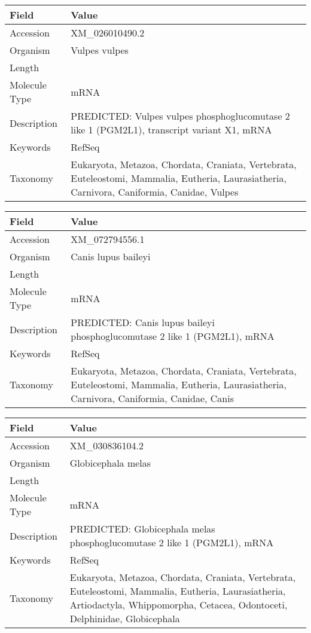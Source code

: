 \documentclass[10pt]{article}
\begin{document}
\vspace{1em}
{\footnotesize
\begin{longtable}{>{\raggedright\arraybackslash}p{4.5cm} >{\raggedright\arraybackslash}p{11.5cm}}
\textbf{Field} & \textbf{Value} \\
\hline
Accession & XM\_026010490.2 \\
Organism & Vulpes vulpes \\
Length & 7882 \\
Molecule Type & mRNA \\
Description & PREDICTED: Vulpes vulpes phosphoglucomutase 2 like 1 (PGM2L1), transcript variant X1, mRNA \\
Keywords & RefSeq \\
Taxonomy & Eukaryota, Metazoa, Chordata, Craniata, Vertebrata, Euteleostomi, Mammalia, Eutheria, Laurasiatheria, Carnivora, Caniformia, Canidae, Vulpes \\
\end{longtable}
}

\vspace{1em}
{\footnotesize
\begin{longtable}{>{\raggedright\arraybackslash}p{4.5cm} >{\raggedright\arraybackslash}p{11.5cm}}
\textbf{Field} & \textbf{Value} \\
\hline
Accession & XM\_072794556.1 \\
Organism & Canis lupus baileyi \\
Length & 7945 \\
Molecule Type & mRNA \\
Description & PREDICTED: Canis lupus baileyi phosphoglucomutase 2 like 1 (PGM2L1), mRNA \\
Keywords & RefSeq \\
Taxonomy & Eukaryota, Metazoa, Chordata, Craniata, Vertebrata, Euteleostomi, Mammalia, Eutheria, Laurasiatheria, Carnivora, Caniformia, Canidae, Canis \\
\end{longtable}
}

\vspace{1em}
{\footnotesize
\begin{longtable}{>{\raggedright\arraybackslash}p{4.5cm} >{\raggedright\arraybackslash}p{11.5cm}}
\textbf{Field} & \textbf{Value} \\
\hline
Accession & XM\_030836104.2 \\
Organism & Globicephala melas \\
Length & 8027 \\
Molecule Type & mRNA \\
Description & PREDICTED: Globicephala melas phosphoglucomutase 2 like 1 (PGM2L1), mRNA \\
Keywords & RefSeq \\
Taxonomy & Eukaryota, Metazoa, Chordata, Craniata, Vertebrata, Euteleostomi, Mammalia, Eutheria, Laurasiatheria, Artiodactyla, Whippomorpha, Cetacea, Odontoceti, Delphinidae, Globicephala \\
\end{longtable}
}
\end{document}
